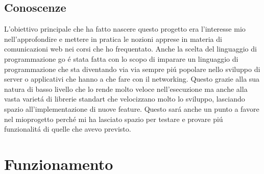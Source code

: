 \subsection{Conoscenze}
L'obiettivo principale che ha fatto nascere questo progetto era l'interesse mio nell'approfondire e mettere in pratica le nozioni apprese in materia di comunicazioni web nei corsi che ho frequentato. Anche la scelta del linguaggio di programmazione go é stata fatta con lo scopo di imparare un linguaggio di programmazione che sta diventando via via sempre piú popolare nello sviluppo di server o applicativi che hanno a che fare con il networking. Questo grazie alla sua natura di basso livello che lo rende molto veloce nell'esecuzione ma anche alla vasta varietá di librerie standart che velocizzano molto lo sviluppo, lasciando spazio all'implementazione di nuove feature. Questo sará anche un punto a favore nel mioprogetto perché mi ha lasciato spazio per testare e provare piú funzionalitá di quelle che avevo previsto.

\section{Funzionamento}
